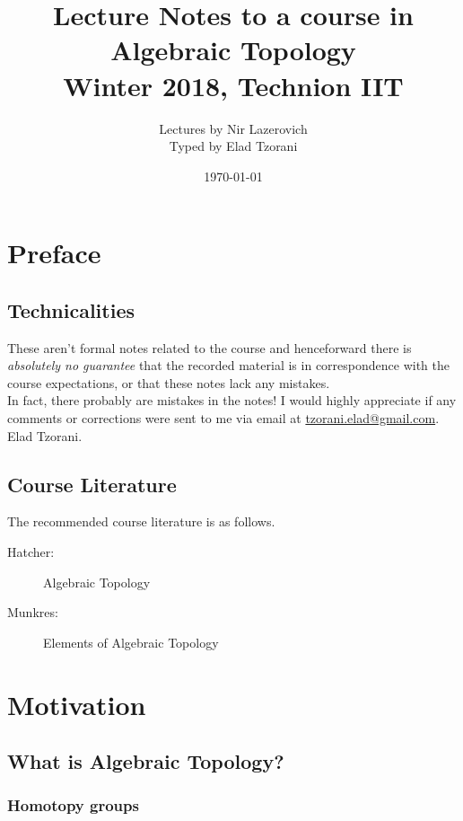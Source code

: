 \documentclass[10pt,a4paper,twoside,openany,hidelinks]{book}
\title{Lecture Notes to a course in Algebraic Topology \\ \large{Winter 2018, Technion IIT}}
\author{Lectures by Nir Lazerovich \\ \large Typed by Elad Tzorani}
\date{\today}
\begin{document}
\frontmatter
{}
\tableofcontents
\countlectures
\newpage

\chapter*{Preface}
 

\section*{Technicalities}

These aren't formal notes related to the course and henceforward there is \emph{absolutely no guarantee} that the recorded material is in correspondence with the course expectations, or that these notes lack any mistakes.\\
In fact, there probably are mistakes in the notes! I would highly appreciate if any comments or corrections were sent to me via email at \href{mailto:tzorani.elad@gmail.com}{tzorani.elad@gmail.com}.\\
Elad Tzorani.

\section*{Course Literature}

The recommended course literature is as follows.
\begin{description}
\item[Hatcher:] Algebraic Topology
\item[Munkres:] Elements of Algebraic Topology
\end{description}

\mainmatter

\chapter{Motivation}

\section{What is Algebraic Topology?}

\subsection{Homotopy groups}
\end{document}
